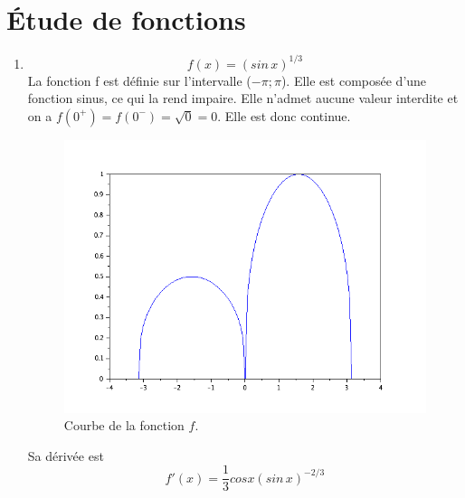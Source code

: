 \documentclass[a4paper,12pt]{report}
\begin{document}
\chapter{\'Etude de fonctions}
	\begin{enumerate}
	\item \[f(x)=(sin\,x)^{1/3}\]
	La fonction f est d\'efinie sur l'intervalle ($-\pi;\pi$). Elle est compos\'ee d'une fonction sinus, ce qui la rend impaire. Elle n'admet aucune valeur interdite et on a $f(0^+)=f(0^-)=\sqrt{0}=0$. Elle est donc continue.
	\begin{figure}[h!]
		\centering
		\includegraphics[scale=0.5]{ex2_fig1.png}
		\caption{\label{figure1}Courbe de la fonction $f$.}
		\end{figure}
	Sa d\'eriv\'ee est \[f'(x)=\frac{1}{3} cos x (sin\,x)^{-2/3}\] 
	

\end{enumerate}
\end{document}
